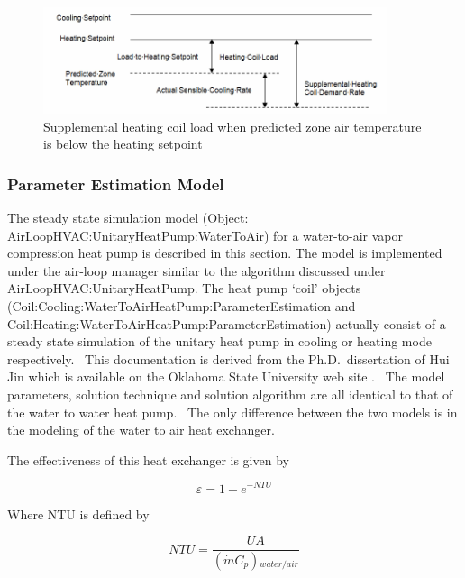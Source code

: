 \begin{figure}[hbtp] %
\centering
\includegraphics[width=0.9\textwidth, height=0.9\textheight, keepaspectratio=true]{media/image5263.png}
\caption{Supplemental heating coil load when predicted zone air temperature is below the heating setpoint \protect \label{fig:supplemental-heating-coil-load-when-predicted-005}}
\end{figure}

\subsubsection{Parameter Estimation Model}\label{parameter-estimation-model}

The steady state simulation model (Object: AirLoopHVAC:UnitaryHeatPump:WaterToAir) for a water-to-air vapor compression heat pump is described in this section. The model is implemented under the air-loop manager similar to the algorithm discussed under AirLoopHVAC:UnitaryHeatPump. The heat pump `coil' objects \\
(Coil:Cooling:WaterToAirHeatPump:ParameterEstimation and Coil:Heating:WaterToAirHeatPump:ParameterEstimation) actually consist of a steady state simulation of the unitary heat pump in cooling or heating mode respectively.~ This documentation is derived from the Ph.D.~dissertation of Hui Jin which is available on the Oklahoma State University web site . ~The model parameters, solution technique and solution algorithm are all identical to that of the water to water heat pump.~ The only difference between the two models is in the modeling of the water to air heat exchanger.

The effectiveness of this heat exchanger is given by

\begin{equation}
\varepsilon  = 1 - {e^{ - NTU}}
\end{equation}

Where NTU is defined by

\begin{equation}
NTU = \frac{{UA}}{{(\dot mC{}_p){}_{water/air}}}
\end{equation}


